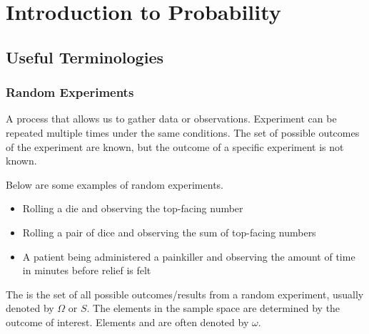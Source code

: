\chapter{Introduction to Probability}

\section{Useful Terminologies}

\subsection{Random Experiments}

\begin{definition}
    A process that allows us to gather data or observations. Experiment can be repeated multiple times under the same conditions. The set of possible outcomes of the experiment are known, but the outcome of a specific experiment is not known.
\end{definition}

\begin{example}
    Below are some examples of random experiments. 

    \begin{itemize}
        \item Rolling a die and observing the top-facing number 
        \item Rolling a pair of dice and observing the sum of top-facing numbers 
        \item A patient being administered a painkiller and observing the amount of time in minutes before relief is felt
    \end{itemize}
\end{example}

\begin{definition}
    The  is the set of all possible outcomes/results from a random experiment, usually denoted by $\Omega$ or $S$. The elements in the sample space are determined by the outcome of interest. Elements and are often denoted by $\omega$.
\end{definition}

